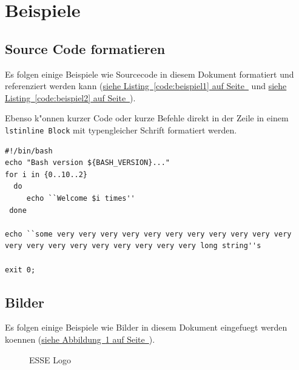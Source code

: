 \documentclass[12pt,a4paper,titlepage,oneside]{scrartcl}
\begin{document}
\section{Beispiele}

\subsection{Source Code formatieren}
Es folgen einige Beispiele wie Sourcecode in diesem Dokument formatiert und referenziert werden kann
(\hyperref[code:beispiel1]{siehe Listing~\ref*{code:beispiel1} auf Seite~\pageref*{code:beispiel1}} und \hyperref[code:beispiel2]{siehe Listing~\ref*{code:beispiel2} auf Seite~\pageref*{code:beispiel2}}).

Ebenso k"onnen kurzer Code oder kurze Befehle direkt in der Zeile in einem \lstinline{lstinline Block} mit typengleicher Schrift formatiert werden.

%

\begin{lstlisting}[caption=Example bash script,label=code:beispiel2,style=simple]
#!/bin/bash
echo "Bash version ${BASH_VERSION}..."
for i in {0..10..2}
  do
     echo ``Welcome $i times''
 done

echo ``some very very very very very very very very very very very very very very very very very very very very long string''s

exit 0;
\end{lstlisting}

\subsection{Bilder}

Es folgen einige Beispiele wie Bilder in diesem Dokument eingefuegt werden koennen
(\hyperref[fig:logo1]{siehe Abbildung~\ref*{fig:logo1} auf Seite~\pageref*{fig:logo1}}).

\begin{figure}[h!]
  \centering
  \caption{ESSE Logo}
  \label{fig:logo1}
\end{figure}
\end{document}
